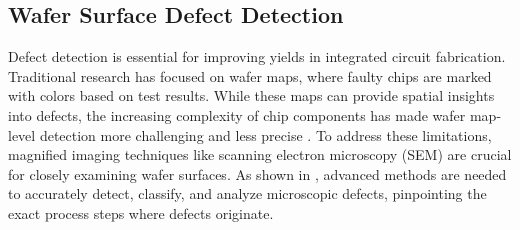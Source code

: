 
\subsection{Wafer Surface Defect Detection}


Defect detection is essential for improving yields in integrated circuit fabrication. Traditional research has focused on wafer maps, where faulty chips are marked with colors based on test results. While these maps can provide spatial insights into defects, the increasing complexity of chip components has made wafer map-level detection more challenging and less precise \cite{Wafer-2020TSM-DCNN, Wafer-2022TSM-FusionTransformer, Wafer-2023ASPDAC-Survey, ma2023review}.
To address these limitations, magnified imaging techniques like scanning electron microscopy (SEM) are crucial for closely examining wafer surfaces. As shown in , advanced methods are needed to accurately detect, classify, and analyze microscopic defects, pinpointing the exact process steps where defects originate.

